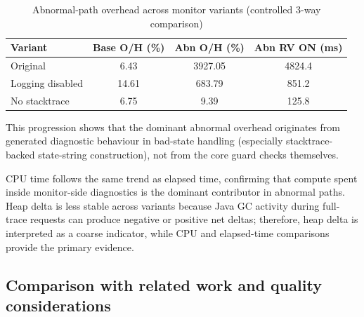 \begin{table}[ht]
    \centering
    \caption{Abnormal-path overhead across monitor variants (controlled 3-way comparison)}
    \label{tab:rv-overhead-variants}
    \scriptsize
    \begin{tabular}{l|c|c|c}
    \textbf{Variant} & \textbf{Base O/H (\%)} & \textbf{Abn O/H (\%)} & \textbf{Abn RV ON (ms)} \\ \hline
    Original & 6.43 & 3927.05 & 4824.4 \\
    Logging disabled & 14.61 & 683.79 & 851.2 \\
    No stacktrace & 6.75 & 9.39 & 125.8 \\
    \end{tabular}
\end{table}

This progression shows that the dominant abnormal overhead originates from generated diagnostic behaviour in bad-state handling (especially stacktrace-backed state-string construction), not from the core guard checks themselves.

\begin{table}[ht]
    \centering
    \caption{Resource metrics across monitor variants (controlled 3-way comparison, abnormal runs)}
    \label{tab:rv-resource-variants}
    \scriptsize
\end{table}

CPU time follows the same trend as elapsed time, confirming that compute spent inside monitor-side diagnostics is the dominant contributor in abnormal paths. Heap delta is less stable across variants because Java GC activity during full-trace requests can produce negative or positive net deltas; therefore, heap delta is interpreted as a coarse indicator, while CPU and elapsed-time comparisons provide the primary evidence.

\subsection{Comparison with related work and quality considerations}


